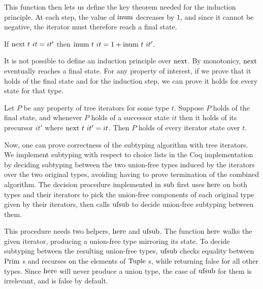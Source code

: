 \documentclass[a4paper,english]{lipics-v2019}
\renewcommand{\c}[1]{\ensuremath{\text{\lstinline{#1}}}\xspace}
\begin{document}
\noindent This function then lets us define the key theorem needed for the
induction principle. At each step, the value of \c{inum} decreases by 1, and
since it cannot be negative, the iterator must therefore reach a final
state.

\begin{lemma}[Monotonicity]\label{inum_mono}
If $\c{next}~t~it = it'$ then $\c{inum}~t~it = 1 + \c{inum}~t~it'$.
\end{lemma}

\noindent
It is not possible to define an induction principle over \c{next}. By
monotonicy, \c{next} eventually reaches a final state.  For any property
of interest, if we prove that it holds of the final state and for the
induction step, we can prove it holds for every state for that type.

\begin{theorem}\label{indprop}
Let $P$ be any property of tree iterators for some type $t$.  Suppose $P$
holds of the final state, and whenever $P$ holds of a successor state $it$
then it holds of its precursor $it'$ where $\c{next}~t~it' = it$.  Then $P$
holds of every iterator state over $t$.
\end{theorem} 

\noindent Now, one can prove correctness of the subtyping algorithm with tree
iterators. We implement subtyping with respect to choice lists in the Coq
implementation by deciding subtyping between the two union-free types induced
by the iterators over the two original types, avoiding having to prove
termination of the combined algorithm. The decision procedure implemented in
\c{sub} first uses \c{here} on both types and their iterators to pick the
union-free components of each original type given by their iterators, then
calls \c{ufsub} to decide union-free subtyping between them. 

This procedure needs two helpers, \c{here} and \c{ufsub}. The function
\c{here} walks the given iterator, producing a union-free type mirroring its
state.  To decide subtyping between the resulting union-free types, \c{ufsub}
checks equality between \c{Prim}s and recurses on the elements of \c{Tuple}s,
while returning false for all other types. Since \c{here} will never produce a
union type, the case of \c{ufsub} for them is irrelevant, and is false by
default.
\end{document}

